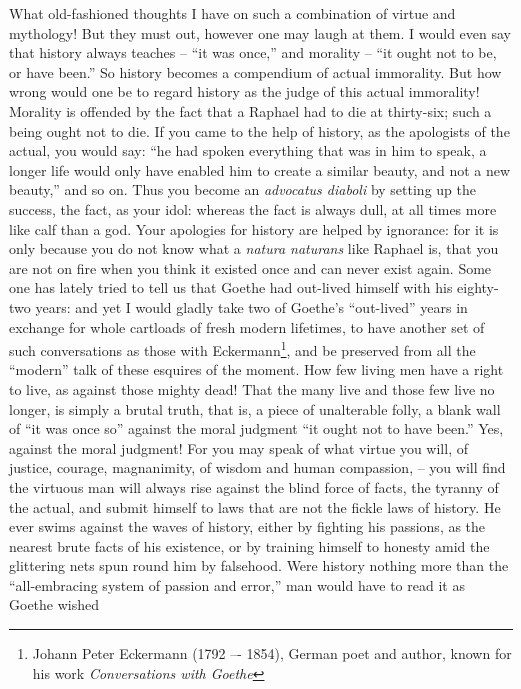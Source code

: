 What old-fashioned thoughts I have on such a combination of virtue
and mythology! But they must out, however one may laugh at them. I
would even say that history always teaches -- \enquote{it was once,} and
morality -- \enquote{it ought not to be, or have been.} So history becomes a
compendium of actual immorality. But how wrong would one be to regard
history as the judge of this actual immorality! Morality is offended
by the fact that a Raphael had to die at thirty-six; such a being
ought not to die. If you came to the help of history, as the
apologists of the actual, you would say: \enquote{he had spoken everything
that was in him to speak, a longer life would only have enabled him
to create a similar beauty, and not a new beauty,} and so on. Thus
you become an \textit{advocatus diaboli} by setting up the success, the
fact, as your idol: whereas the fact is always dull, at all times
more like calf than a god. Your apologies for history are helped by
ignorance: for it is only because you do not know what a \textit{natura
naturans} like Raphael is, that you are not on fire when you think it
existed once and can never exist again. Some one has lately tried to
tell us that Goethe had out-lived himself with his eighty-two years:
and yet I would gladly take two of Goethe's \enquote{out-lived} years in
exchange for whole cartloads of fresh modern lifetimes, to have
another set of such conversations as those with Eckermann\footnote{Johann Peter Eckermann (1792 –- 1854), German poet and author, known for his work \textit{Conversations with Goethe}}, and be
preserved from all the \enquote{modern} talk of these esquires of the moment.
How few living men have a right to live, as against those mighty
dead! That the many live and those few live no longer, is simply a
brutal truth, that is, a piece of unalterable folly, a blank wall of
\enquote{it was once so} against the moral judgment \enquote{it ought not to have
been.} Yes, against the moral judgment! For you may speak of what
virtue you will, of justice, courage, magnanimity, of wisdom and
human compassion, -- you will find the virtuous man will always rise
against the blind force of facts, the tyranny of the actual, and
submit himself to laws that are not the fickle laws of history. He
ever swims against the waves of history, either by fighting his
passions, as the nearest brute facts of his existence, or by training
himself to honesty amid the glittering nets spun round him by
falsehood. Were history nothing more than the \enquote{all-embracing system
of passion and error,} man would have to read it as Goethe wished
